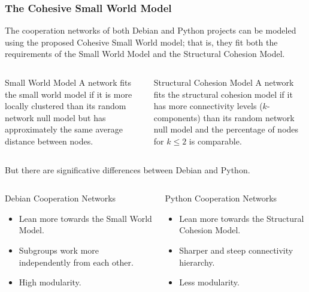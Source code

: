 \documentclass[ignorenonframetext,red,8pt,notes=hide]{beamer}
\begin{document}
\begin{frame}
\frametitle{The Cohesive Small World Model}

The cooperation networks of both Debian and Python projects can be modeled using the proposed Cohesive Small World model; that is, they fit both the requirements of the Small World Model and the Structural Cohesion Model.

\begin{columns}[c]
\begin{column}{0.5\textwidth}
\begin{block}{Small World Model}
A network fits the small world model if it is more locally clustered than its random network null model but has approximately the same average distance between nodes.
\end{block}
\end{column}

\begin{column}{0.5\textwidth}

\begin{block}{Structural Cohesion Model}
A network fits the structural cohesion model if it has more connectivity levels ($k$-components) than its random network null model and the percentage of nodes for $k \leq 2$ is comparable. 
\end{block}
\end{column}
\end{columns}

\pause

\vspace{0.2cm}
But there are significative differences between Debian and Python.

\begin{columns}[c]
\begin{column}{0.5\textwidth}
\begin{block}{Debian Cooperation Networks}
\begin{itemize}
\item Lean more towards the Small World Model.
\item Subgroups work more independently from each other.
\item High modularity.
\end{itemize}
\end{block}
\end{column}

\begin{column}{0.5\textwidth}

\begin{block}{Python Cooperation Networks}
\begin{itemize}
\item Lean more towards the Structural Cohesion Model. 
\item Sharper and steep connectivity hierarchy.
\item Less modularity.
\end{itemize}
\end{block}
\end{column}
\end{columns}

\end{frame}
\end{document}
